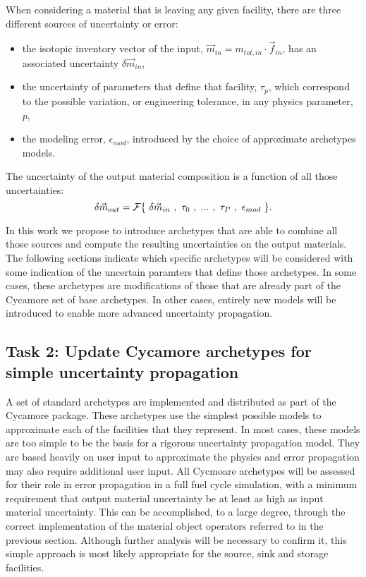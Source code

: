 \documentclass[dvips,12pt]{article}
\newcommand{\unc}[1]
{ \delta #1 }
\begin{document}
When considering a material that is leaving any
given facility, there are three different sources
of uncertainty or error:
\begin{itemize}
\item the isotopic inventory vector of the input,
  $\vec{m}_{in} = m_{tot,in} \cdot \vec{f}_{in}$,
  has an associated uncertainty $\unc{\vec{m}_{in}}$,
\item the uncertainty of parameters that define that
  facility, $\tau_{p}$, 
  which correspond to the possible
  variation, or engineering tolerance, in any physics parameter, $p$,
\item the modeling error, $\epsilon_{mod}$, introduced by
  the choice of approximate archetypes models.
\end{itemize}
The uncertainty of the output material composition is a
function of all those uncertainties:
\begin{equation}
  \delta \vec{m}_{out} = 
         {\cal F}\{~\unc{\vec{m}_{in}}~,~\tau_0~,~...~,~\tau_P~,~\epsilon_{mod}~\}.
\end{equation}

In this work we propose to introduce archetypes
that are able to combine all those sources and
compute the resulting uncertainties on the output
materials.  The following sections indicate which
specific archetypes will be considered with some
indication of the uncertain paramters that define
those archetypes.  In some cases, these archetypes
are modifications of those that are already part
of the Cycamore set of base archetypes.  In other
cases, entirely new models will be introduced to
enable more advanced uncertainty propagation.

\subsection{Task 2: Update Cycamore archetypes for simple uncertainty propagation}

A set of standard archetypes are implemented and
distributed as part of the Cycamore package.
These archetypes use the simplest possible models
to approximate each of the facilities that they
represent.  In most cases, these models are too
simple to be the basis for a rigorous uncertainty
propagation model.  They are based heavily on user
input to approximate the physics and error
propagation may also require additional user
input.  All Cycmoare archetypes will be assessed
for their role in error propagation in a full fuel
cycle simulation, with a minimum requirement that
output material uncertainty be at least as high as
input material uncertainty.  This can be
accomplished, to a large degree, through the
correct implementation of the material object
operators referred to in the previous section.
Although further analysis will be necessary to
confirm it, this simple approach is most likely
appropriate for the source, sink
and storage facilities.
\end{document}
